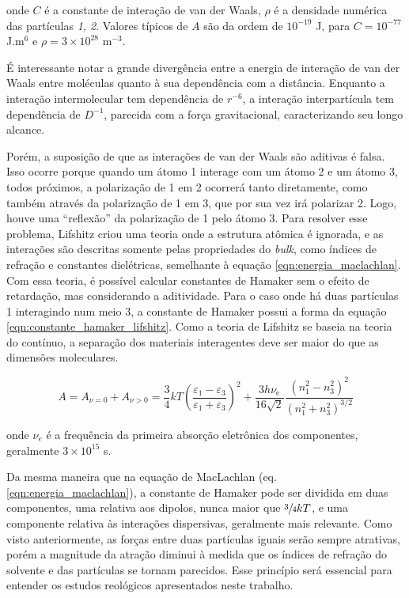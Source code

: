 	\noindent onde \(C\) é a constante de interação de van der Waals, \(\rho\) é a densidade numérica das partículas \emph{1, 2}. Valores típicos de \(A\) são da ordem de \(10^{-19}\) J, para \(C = 10^{-77}\) J.m\(^6\) e \(\rho=3 \times 10^{28}\) m\(^{-3}\).
	
	É interessante notar a grande divergência entre a energia de interação de van der Waals entre moléculas quanto à sua dependência com a distância. Enquanto a interação intermolecular tem dependência de \(r^{-6}\), a interação interpartícula tem dependência de \(D^{-1}\), parecida com a força gravitacional, caracterizando seu longo alcance.
	
	Porém, a suposição de que as interações de van der Waals são aditivas é falsa. Isso ocorre porque quando um átomo 1 interage com um átomo 2 e um átomo 3, todos próximos, a polarização de 1 em 2 ocorrerá tanto diretamente, como também através da polarização de 1 em 3, que por sua vez irá polarizar 2. Logo, houve uma ``reflexão'' da polarização de 1 pelo átomo 3. Para resolver esse problema, Lifshitz criou uma teoria onde a estrutura atômica é ignorada, e as interações são descritas somente pelas propriedades do \emph{bulk}, como índices de refração e constantes dielétricas, semelhante à equação \ref{eqn:energia_maclachlan}. Com essa teoria, é possível calcular constantes de Hamaker sem o efeito de retardação, mas considerando a aditividade. Para o caso onde há duas partículas 1 interagindo num meio 3, a constante de Hamaker possui a forma da equação \ref{eqn:constante_hamaker_lifshitz}. Como a teoria de Lifshitz se baseia na teoria do contínuo, a separação dos materiais interagentes deve ser maior do que as dimensões moleculares.
	
	\begin{equation}
	A = A_{\nu=0} + A_{\nu>0}  = \frac{3}{4} kT \left( \frac { \varepsilon_{1}-\varepsilon_{3}} { \varepsilon_{1} + \varepsilon_{3} } \right)^{2} + \frac{3h\nu_{\mathrm{e} } } {16\sqrt{2}} \frac{\left(n_{1}^{2} - n_{3}^{2} \right)^{2}} {\left(n_{1}^{2} + n_{3}^{2} \right)^{3/2} }
	\label{eqn:constante_hamaker_lifshitz}
	\end{equation}
	
	\noindent onde \(\nu_e\) é a frequência da primeira absorção eletrônica dos componentes, geralmente \(3 \times 10^{15}\) s\menosUm.
	
	Da mesma maneira que na equação de MacLachlan (eq. \ref{eqn:energia_maclachlan}), a constante de Hamaker pode ser dividida em duas componentes, uma relativa aos dipolos, nunca maior que \(\sfrac{3}{4}kT\), e uma componente relativa às interações dispersivas, geralmente mais relevante. Como visto anteriormente, as forças entre duas partículas iguais serão sempre atrativas, porém a magnitude da atração diminui à medida que os índices de refração do solvente e das partículas se tornam parecidos. Esse princípio será essencial para entender os estudos reológicos apresentados neste trabalho.
	
